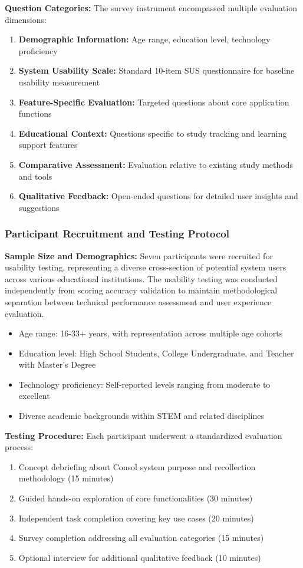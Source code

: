 {\textbf{Question Categories:} The survey instrument encompassed multiple evaluation dimensions:
\begin{enumerate}
    \item \textbf{Demographic Information:} Age range, education level, technology proficiency
    \item \textbf{System Usability Scale:} Standard 10-item SUS questionnaire for baseline usability measurement
    \item \textbf{Feature-Specific Evaluation:} Targeted questions about core application functions
    \item \textbf{Educational Context:} Questions specific to study tracking and learning support features
    \item \textbf{Comparative Assessment:} Evaluation relative to existing study methods and tools
    \item \textbf{Qualitative Feedback:} Open-ended questions for detailed user insights and suggestions
\end{enumerate}

\subsubsection{Participant Recruitment and Testing Protocol}

{\color{maroon}
\textbf{Sample Size and Demographics:} Seven participants were recruited for usability testing, representing a diverse cross-section of potential system users across various educational institutions. The usability testing was conducted independently from scoring accuracy validation to maintain methodological separation between technical performance assessment and user experience evaluation.
}
\begin{itemize}
    \item Age range: 16-33+ years, with representation across multiple age cohorts
    \item Education level: High School Students, College Undergraduate, and Teacher with Master's Degree
    \item Technology proficiency: Self-reported levels ranging from moderate to excellent
    \item Diverse academic backgrounds within STEM and related disciplines
\end{itemize}

\textbf{Testing Procedure:} Each participant underwent a standardized evaluation process:
\begin{enumerate}
    \item Concept debriefing about Consol system purpose and recollection methodology (15 minutes)
    \item Guided hands-on exploration of core functionalities (30 minutes)
    \item Independent task completion covering key use cases (20 minutes)
    \item Survey completion addressing all evaluation categories (15 minutes)
    \item Optional interview for additional qualitative feedback (10 minutes)
\end{enumerate}

}
